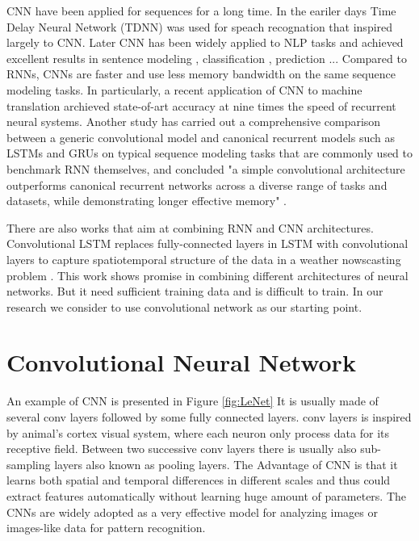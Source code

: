CNN have been applied for sequences for a long time. In the eariler days Time Delay Neural Network (TDNN) was used for speach recognation \cite{waibel1990phoneme} that inspired largely to CNN. Later CNN has been widely applied to NLP tasks and achieved excellent results in sentence modeling \cite{kalchbrenner2014convolutional}, classification \cite{kim2014convolutional}, prediction \cite{collobert2008unified}... Compared to RNNs, CNNs are faster and use less memory bandwidth on the same sequence modeling tasks. In particularly, a recent application of CNN to machine translation \cite{gehring2017convolutional} archieved state-of-art accuracy at nine times the speed of recurrent neural systems. Another study has carried out a comprehensive comparison between a generic convolutional model and canonical recurrent models such as LSTMs and GRUs on typical sequence modeling tasks that are commonly used to benchmark RNN themselves, and concluded "a simple convolutional architecture outperforms canonical recurrent networks across a diverse range of tasks and datasets, while demonstrating longer effective memory" \cite{bai2018empirical}. 

There are also works that aim at combining RNN and CNN architectures. Convolutional LSTM replaces fully-connected layers in LSTM with convolutional layers to capture spatiotemporal structure of the data in a weather nowscasting problem \cite{xingjian2015convolutional}. This work shows promise in combining different architectures of neural networks. But it need sufficient training data and is difficult to train. In our research we consider to use convolutional network as our starting point.


\section{Convolutional Neural Network}
 An example of CNN is presented in Figure \ref{fig:LeNet} It is usually made of several conv layers followed by some fully connected layers. conv layers is inspired by animal's cortex visual system, where each neuron only process data for its receptive field. Between two successive conv layers there is usually also sub-sampling layers also known as pooling layers. The Advantage of CNN is that it learns both spatial and temporal differences in different scales and thus could extract features automatically without learning huge amount of parameters. The CNNs are widely adopted as a very effective model for analyzing images or images-like data for pattern recognition. 

